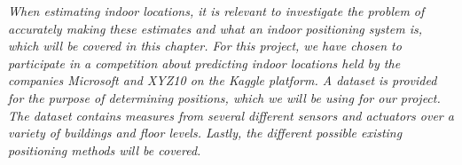 
\textit{When estimating indoor locations, it is relevant to investigate the problem of accurately making these estimates and what an indoor positioning system is, which will be covered in this chapter. For this project, we have chosen to participate in a competition about predicting indoor locations held by the companies Microsoft and XYZ10 on the Kaggle platform. A dataset is provided for the purpose of determining positions, which we will be using for our project. The dataset contains measures from several different sensors and actuators over a variety of buildings and floor levels. Lastly, the different possible existing positioning methods will be covered.}